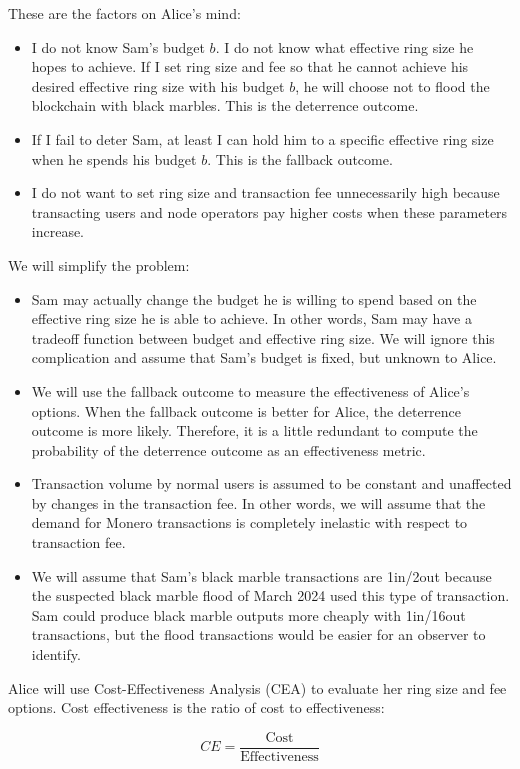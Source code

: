 \documentclass[english]{article}
\begin{document}
These are the factors on Alice's mind:
\begin{itemize}
\item I do not know Sam's budget $b$. I do not know what effective ring
size he hopes to achieve. If I set ring size and fee so that he cannot
achieve his desired effective ring size with his budget $b$, he will
choose not to flood the blockchain with black marbles. This is the
deterrence outcome.
\item If I fail to deter Sam, at least I can hold him to a specific effective
ring size when he spends his budget $b$. This is the fallback outcome.
\item I do not want to set ring size and transaction fee unnecessarily high
because transacting users and node operators pay higher costs when
these parameters increase.
\end{itemize}
We will simplify the problem:
\begin{itemize}
\item Sam may actually change the budget he is willing to spend based on
the effective ring size he is able to achieve. In other words, Sam
may have a tradeoff function between budget and effective ring size.
We will ignore this complication and assume that Sam's budget is fixed,
but unknown to Alice.
\item We will use the fallback outcome to measure the effectiveness of Alice's
options. When the fallback outcome is better for Alice, the deterrence
outcome is more likely. Therefore, it is a little redundant to compute
the probability of the deterrence outcome as an effectiveness metric.
\item Transaction volume by normal users is assumed to be constant and unaffected
by changes in the transaction fee. In other words, we will assume
that the demand for Monero transactions is completely inelastic with
respect to transaction fee.
\item We will assume that Sam's black marble transactions are 1in/2out because
the suspected black marble flood of March 2024 used this type of transaction.
Sam could produce black marble outputs more cheaply with 1in/16out
transactions, but the flood transactions would be easier for an observer
to identify.
\end{itemize}
Alice will use Cost-Effectiveness Analysis (CEA) to evaluate her ring
size and fee options. Cost effectiveness is the ratio of cost to effectiveness:

\begin{equation}
CE=\dfrac{\mathrm{Cost}}{\mathrm{Effectiveness}}
\end{equation}
\end{document}
